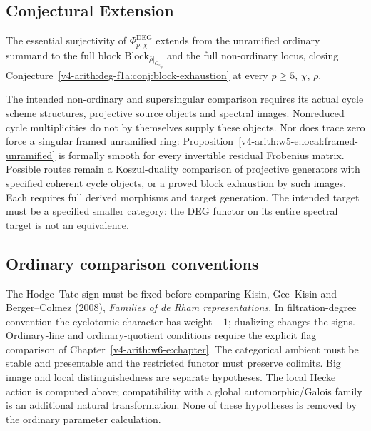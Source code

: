 \subsection{Conjectural Extension}

\begin{conjecture}
\label{v4-arith:w5-e:conj:f1a1-full}
\ClaimStatusConjectured The essential surjectivity of
\(\Phi^{\mathrm{DEG}}_{p,\chi}\) extends from the unramified ordinary
summand to the full block
\(\mathrm{Block}_{\bar\rho|_{G_{\mathbb{Q}_{p}}}}\) and the full
non-ordinary locus, closing
Conjecture~\ref{v4-arith:deg-f1a:conj:block-exhaustion} at every
\(p\geq 5\), \(\chi\), \(\bar\rho\).
\end{conjecture}

\begin{remark}
\label{v4-arith:w5-e:rem:f1a1-residual}
The intended non-ordinary and supersingular comparison requires its
actual cycle scheme structures, projective source objects and spectral
images. Nonreduced cycle multiplicities do not by themselves supply
these objects. Nor does trace zero force a singular framed unramified
ring: Proposition~\ref{v4-arith:w5-e:local:framed-unramified} is formally
smooth for every invertible residual Frobenius matrix. Possible routes
remain a Koszul-duality comparison of projective generators with
specified coherent cycle objects, or a proved block exhaustion by such
images. Each requires full derived morphisms and target generation.
The intended target must be a specified smaller category: the DEG
functor on its entire spectral target is not an equivalence.
\end{remark}

\subsection{Ordinary comparison conventions}
The Hodge--Tate sign must be fixed before comparing Kisin, Gee--Kisin
and Berger--Colmez (2008), \emph{Families of de Rham representations}.
In filtration-degree convention the cyclotomic character has weight
$-1$; dualizing changes the signs. Ordinary-line and ordinary-quotient
conditions require the explicit flag comparison of
Chapter~\ref{v4-arith:w6-e:chapter}. The categorical ambient must be
stable and presentable and the restricted functor must preserve
colimits. Big image and local distinguishedness are separate
hypotheses. The local Hecke action is computed above; compatibility
with a global automorphic/Galois family is an additional natural
transformation. None of these hypotheses is removed by the ordinary
parameter calculation.

